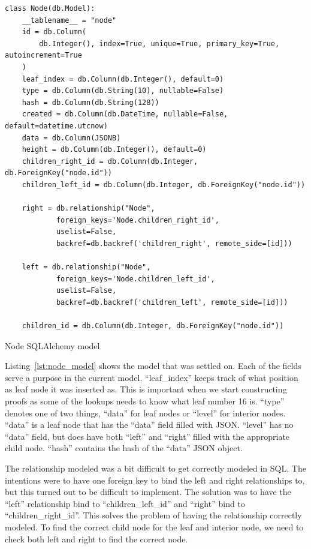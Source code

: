\documentclass[../Main/thesis.tex]{subfiles}
\begin{document}
\begin{listing}[H]
\begin{verbatim}
class Node(db.Model):
    __tablename__ = "node"
    id = db.Column(
        db.Integer(), index=True, unique=True, primary_key=True, autoincrement=True
    )
    leaf_index = db.Column(db.Integer(), default=0)
    type = db.Column(db.String(10), nullable=False)
    hash = db.Column(db.String(128))
    created = db.Column(db.DateTime, nullable=False, default=datetime.utcnow)
    data = db.Column(JSONB)
    height = db.Column(db.Integer(), default=0)
    children_right_id = db.Column(db.Integer, db.ForeignKey("node.id"))
    children_left_id = db.Column(db.Integer, db.ForeignKey("node.id"))

    right = db.relationship("Node",
            foreign_keys='Node.children_right_id',
            uselist=False,
            backref=db.backref('children_right', remote_side=[id]))

    left = db.relationship("Node", 
            foreign_keys='Node.children_left_id',
            uselist=False,
            backref=db.backref('children_left', remote_side=[id]))

    children_id = db.Column(db.Integer, db.ForeignKey("node.id"))
\end{verbatim}
\caption{Node SQLAlchemy model}
\label{lst:node_model}
\end{listing}

Listing~\ref{lst:node_model} shows the model that was settled on. Each of the
fields serve a purpose in the current model. ``leaf\_index'' keeps track of what
position as leaf node it was inserted as. This is important when we start
constructing proofs as some of the lookups needs to know what leaf number 16 is.
``type'' denotes one of two things, ``data'' for leaf nodes or ``level'' for
interior nodes.  ``data'' is a leaf node that has the ``data'' field filled with
JSON. ``level'' has no ``data'' field, but does have both ``left'' and ``right''
filled with the appropriate child node. ``hash'' contains the hash of the
``data'' JSON object.

The relationship modeled was a bit difficult to get correctly modeled in SQL.
The intentions were to have one foreign key to bind the left and right
relationships to, but this turned out to be difficult to implement. The solution
was to have the ``left'' relationship bind to ``children\_left\_id'' and
``right'' bind to ``children\_right\_id''. This solves the problem of having the
relationship correctly modeled. To find the correct child node for the leaf and
interior node, we need to check both left and right to find the correct node.
\end{document}
